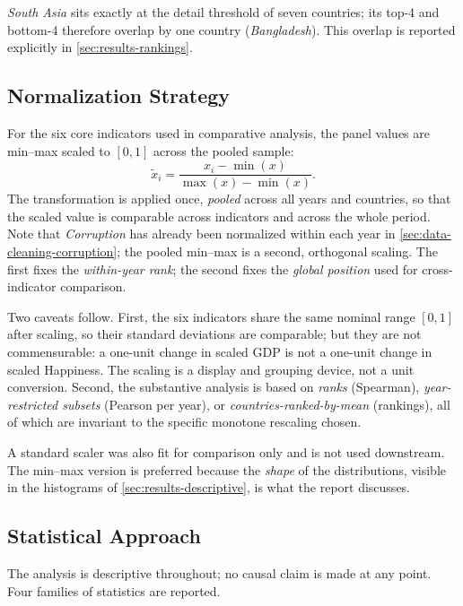 \emph{South Asia} sits exactly at the detail threshold of seven countries; its top-4 and bottom-4 therefore overlap by one country (\emph{Bangladesh}). This overlap is reported explicitly in \cref{sec:results-rankings}.

\subsection{Normalization Strategy}
\label{sec:methodology-normalization}

For the six core indicators used in comparative analysis, the panel values are min--max scaled to $[0,1]$ across the pooled sample:
\[
\tilde x_i = \frac{x_i - \min(x)}{\max(x) - \min(x)}.
\]
The transformation is applied once, \emph{pooled} across all years and countries, so that the scaled value is comparable across indicators and across the whole period. Note that \emph{Corruption} has already been normalized within each year in \cref{sec:data-cleaning-corruption}; the pooled min--max is a second, orthogonal scaling. The first fixes the \emph{within-year rank}; the second fixes the \emph{global position} used for cross-indicator comparison.

Two caveats follow. First, the six indicators share the same nominal range $[0,1]$ after scaling, so their standard deviations are comparable; but they are not commensurable: a one-unit change in scaled GDP is not a one-unit change in scaled Happiness. The scaling is a display and grouping device, not a unit conversion. Second, the substantive analysis is based on \emph{ranks} (Spearman), \emph{year-restricted subsets} (Pearson per year), or \emph{countries-ranked-by-mean} (rankings), all of which are invariant to the specific monotone rescaling chosen.

A standard scaler was also fit for comparison only and is not used downstream. The min--max version is preferred because the \emph{shape} of the distributions, visible in the histograms of \cref{sec:results-descriptive}, is what the report discusses.

\subsection{Statistical Approach}
\label{sec:methodology-statistics}

The analysis is descriptive throughout; no causal claim is made at any point. Four families of statistics are reported.

